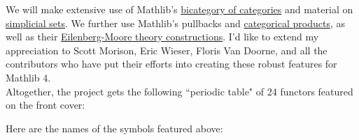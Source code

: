 \documentclass{book}
\theoremstyle{definition}
\begin{document}
We will make extensive use of Mathlib's \href{https://leanprover-community.github.io/mathlib4_docs/Mathlib/CategoryTheory/Category/Cat.html#CategoryTheory.Cat.bicategory}{bicategory of categories} and material on \href{https://github.com/leanprover-community/mathlib4/blob/bd3e369b6f82c874de0f318c71d7e0595f8a3aa4//Mathlib/AlgebraicTopology/SimplicialSet.lean#L47-L48}{simplicial sets}. We further use Mathlib's pullbacks and \href{https://github.com/leanprover-community/mathlib4/blob/bd3e369b6f82c874de0f318c71d7e0595f8a3aa4/Mathlib/CategoryTheory/Products/Basic.lean}{categorical products}, as well as their \href{https://github.com/leanprover-community/mathlib4/blob/bd3e369b6f82c874de0f318c71d7e0595f8a3aa4/Mathlib/CategoryTheory/Monad/Algebra.lean}{Eilenberg-Moore theory constructions}. I'd like to extend my appreciation to Scott Morison, Eric Wieser, Floris Van Doorne, and all the contributors who have put their efforts into creating these robust features for Mathlib 4.\\

Altogether, the project gets the following ``periodic table" of 24 functors featured on the front cover:\\

{\footnotesize
\begin{center}
\end{center}}

Here are the names of the symbols featured above:
\end{document}
